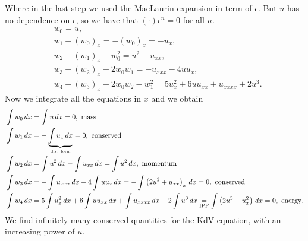Where in the last step we used the MacLaurin expansion in term of \(\epsilon\). But \(u\) has no dependence on \(\epsilon\), so we have that \((\cdot)\epsilon^n = 0\) for all \(n\).
\begin{align*}
    &w_0 = u, \\
    &w_1 + (w_0)_x = -(w_0)_x = -u_x, \\
    &w_2 + (w_1)_x - w_0^2 = u^2 - u_{xx}, \\
    &w_3 + (w_2)_x - 2w_0 w_1 = -u_{xxx} - 4uu_x, \\
    &w_4 + (w_3)_x - 2w_0 w_2 - w_1^2 = 5 u_x^2 + 6 u u_{xx} + u_{xxxx} + 2 u^3.   
\end{align*}
Now we integrate all the equations in \(x\) and we obtain 
\begin{align*}
    &\int w_0 \, dx = \int u \, dx = 0, \text{ mass} \\
    &\int w_1 \, dx = -\underbrace{\int u_x \, dx}_{\text{\tiny div. form}} = 0, \text{ conserved} \\
    &\int w_2 \, dx = \int u^2 \, dx - \int u_{xx} \, dx = \int u^2 \, dx, \text{ momentum} \\
    &\int w_3 \, dx = -\int u_{xxx} \, dx - 4 \int u u_x \, dx = - \int \left(2 u^2 + u_{xx}\right)_x \, dx = 0, \text{ conserved} \\
    &\int w_4 \, dx = 5 \int u_x^2 \, dx + 6 \int u u_{xx} \, dx + \int u_{xxxx} \, dx + 2 \int u^3 \, dx \underset{\text{IPP}}{=} \int \left(2 u^3 - u_x^2\right) \, dx = 0, \text{ energy}.
\end{align*}
We find infinitely many conserved quantities for the KdV equation, with an increasing power of \(u\).

\newpage
